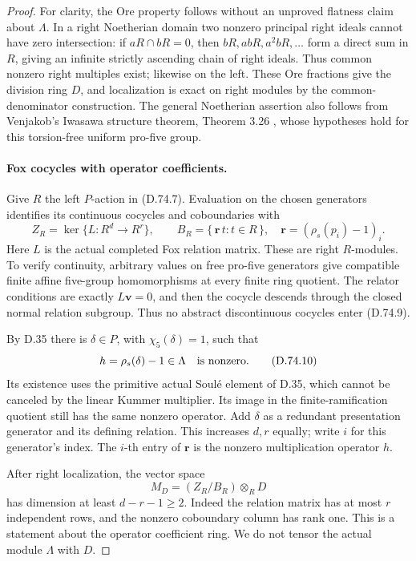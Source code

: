 \begin{proof}
For clarity, the Ore property follows without an
unproved flatness claim about \(\Lambda\). In a right
Noetherian domain two nonzero principal right ideals
cannot have zero intersection: if \(aR\cap bR=0\),
then \(bR,abR,a^2bR,\ldots\) form a direct sum in
\(R\), giving an infinite strictly ascending chain
of right ideals. Thus common nonzero right multiples
exist; likewise on the left. These Ore fractions give
the division ring \(D\), and localization is exact on
right modules by the common-denominator construction.
The general Noetherian assertion also follows from
Venjakob's Iwasawa structure theorem, Theorem 3.26
\cite{DE_Venjakob2001Structure},
whose hypotheses hold for this torsion-free uniform
pro-five group.

\paragraph{Fox cocycles with operator coefficients.}
Give \(R\) the left \(P\)-action in (D.74.7).
Evaluation on the chosen generators identifies its
continuous cocycles and coboundaries with
\[
 Z_R=\ker\{L:R^d\to R^r\},\qquad
 B_R=\{\,\mathbf r\,t:t\in R\,\},\quad
 \mathbf r=(\rho_s(p_i)-1)_i.                           \tag{D.74.9}
\]
Here \(L\) is the actual completed Fox relation matrix.
These are right \(R\)-modules. To verify continuity,
arbitrary values on free pro-five generators give
compatible finite affine five-group homomorphisms
at every finite ring quotient. The relator conditions
are exactly \(L\mathbf v=0\), and then the cocycle
descends through the closed normal relation subgroup.
Thus no abstract discontinuous cocycles enter (D.74.9).

By D.35 there is \(\delta\in P\), with
\(\chi_5(\delta)=1\), such that
\[
                 h=\rho_s(\delta)-1\in\Lambda
                                      \quad\hbox{is nonzero}.
                                                        \tag{D.74.10}
\]
Its existence uses the primitive actual Soul\'e element
of D.35, which cannot be canceled by the linear Kummer
multiplier. Its image in the finite-ramification
quotient still has the same nonzero operator.
Add \(\delta\) as a redundant presentation generator
and its defining relation. This increases \(d,r\)
equally; write \(i\) for this generator's index.
The \(i\)-th entry of \(\mathbf r\) is the
nonzero multiplication operator \(h\).

After right localization, the vector space
\[
             M_D=(Z_R/B_R)\otimes_R D
\]
has dimension at least \(d-r-1\ge2\). Indeed the
relation matrix has at most \(r\) independent rows,
and the nonzero coboundary column has rank one.
This is a statement about the operator coefficient
ring. We do not tensor the actual module
\(\Lambda\) with \(D\).


\end{proof}

